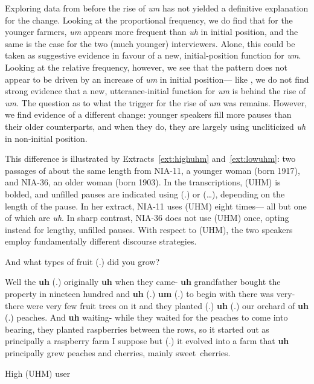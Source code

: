 \documentclass[11pt]{article}
\begin{document}
Exploring data from before the rise of \emph{um} has not yielded a definitive
explanation for the change.
Looking at the proportional frequency, we do find that for the younger
farmers,
\emph{um} appears more frequent than \emph{uh} in initial position, and the same
is the case for the two (much younger) interviewers.
Alone, this could be taken as suggestive evidence in favour of a new,
initial-position function for \emph{um}.
Looking at the relative frequency, however, we see that the pattern does not
appear to be driven by an increase of \emph{um} in initial position---%
like \textcite{fruehwald2016}, we do not find strong evidence that a new,
utterance-initial function for \emph{um} is behind the rise of \emph{um}.
The question as to what the trigger for the rise of \emph{um} was remains.
However, we find evidence of a different change:
younger speakers fill more pauses than their older counterparts, and when they
do, they are largely using uncliticized \emph{uh} in non-initial position.

This difference is illustrated by Extracts~\ref{ext:highuhm}
and~\ref{ext:lowuhm}:
two passages of about the same length from NIA-11, a younger woman (born 1917),
and NIA-36, an older woman (born 1903).
In the transcriptions, (UHM) is bolded, and unfilled pauses are indicated using
(.) or (\ldots), depending on the length of the pause.
In her extract, NIA-11 uses (UHM) eight times---%
all but one of which are \emph{uh}.
In sharp contrast, NIA-36 does not use (UHM) once, opting instead for lengthy,
unfilled pauses.
With respect to (UHM), the two speakers employ fundamentally different discourse
strategies.

\begin{extract}[ht!]
    \begin{mdframed}[leftmargin=10pt,rightmargin=10pt]
        \begin{dialogue}

             And what types of fruit (.) did you grow?

             Well the \textbf{uh} (.) originally \textbf{uh} when they
            came- \textbf{uh} grandfather bought the property in nineteen hundred
            and \textbf{uh} (.) \textbf{um} (.) to begin with there was very- there
            were very few fruit trees on it and they planted (.) \textbf{uh} (.) our
            orchard of \textbf{uh} (.)  peaches. And \textbf{uh} waiting- while they
            waited for the peaches to come into bearing, they planted raspberries
            between the rows, so it started out as principally a raspberry farm I
            suppose but (.) it evolved into a farm that \textbf{uh} principally grew
            peaches and cherries, mainly sweet~cherries.
        \end{dialogue}
    \end{mdframed}
    \caption{High (UHM) user}\label{ext:highuhm}
\end{extract}
\end{document}
